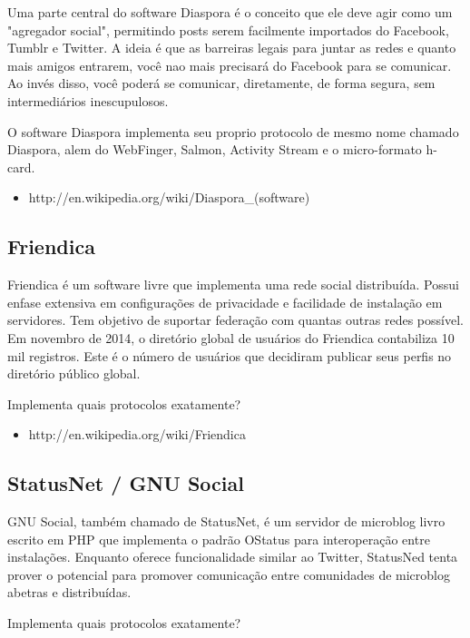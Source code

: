 \documentclass[12pt]{article}
\begin{document}
Uma parte central do software Diaspora é o conceito que ele deve agir como um
"agregador social", permitindo posts serem facilmente importados do Facebook,
Tumblr e Twitter. A ideia é que as barreiras legais para juntar as redes e
quanto mais amigos entrarem, você nao mais precisará do Facebook para se
comunicar. Ao invés disso, você poderá se comunicar, diretamente, de forma
segura, sem intermediários inescupulosos.

O software Diaspora implementa seu proprio protocolo de mesmo nome chamado
Diaspora, alem do WebFinger, Salmon, Activity Stream e o micro-formato h-card.

\begin{itemize}
  \item http://en.wikipedia.org/wiki/Diaspora\_(software)
\end{itemize}

\subsection{Friendica}

Friendica é um software livre que implementa uma rede social distribuída.
Possui enfase extensiva em configurações de privacidade e facilidade de
instalação em servidores. Tem objetivo de suportar federação com quantas
outras redes possível. Em novembro de 2014, o diretório global de usuários do
Friendica contabiliza 10 mil registros. Este é o número de usuários que
decidiram publicar seus perfis no diretório público global.

Implementa quais protocolos exatamente?

\begin{itemize}
  \item http://en.wikipedia.org/wiki/Friendica
\end{itemize}

\subsection{StatusNet / GNU Social}

GNU Social, também chamado de StatusNet, é um servidor de microblog livro
escrito em PHP que implementa o padrão OStatus para interoperação entre
instalações. Enquanto oferece funcionalidade similar ao Twitter, StatusNed
tenta prover o potencial para promover comunicação entre comunidades de
microblog abetras e distribuídas.

Implementa quais protocolos exatamente?
\end{document}
